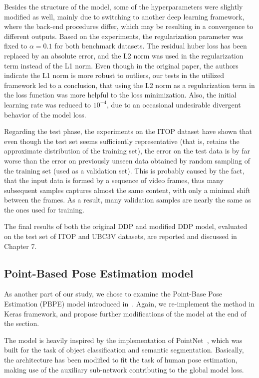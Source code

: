 \noindent Besides the structure of the model, some of the hyperparameters were slightly modified as well, mainly due to switching to another deep learning framework, where the back-end procedures differ, which may be resulting in a convergence to different outputs. Based on the experiments, the regularization parameter was fixed to $\alpha = 0.1$ for both benchmark datasets. The residual huber loss has been replaced by an absolute error, and the L2 norm was used in the regularization term instead of the L1 norm. Even though in the original paper, the authors indicate the L1 norm is more robust to outliers, our tests in the utilized framework led to a conclusion, that using the L2 norm as a regularization term in the loss function was more helpful to the loss minimization. Also, the initial learning rate was reduced to $10^{-4}$, due to an occasional undesirable divergent behavior of the model loss.\par
\vspace{5mm}
\noindent Regarding the test phase, the experiments on the ITOP dataset have shown that even though the test set seems sufficiently representative (that is, retains the approximate distribution of the training set), the error on the test data is by far worse than the error on previously unseen data obtained by random sampling of the training set (used as a validation set). This is probably caused by the fact, that the input data is formed by a sequence of video frames, thus many subsequent samples captures almost the same content, with only a minimal shift between the frames. As a result, many validation samples are nearly the same as the ones used for training.\par
\vspace{5mm}
\noindent
The final results of both the original DDP and modified DDP model, evaluated on the test set of ITOP and UBC3V datasets, are reported and discussed in Chapter 7.


\subsection{Point-Based Pose Estimation model}

As another part of our study, we chose to examine the Point-Base Pose Estimation (PBPE) model introduced in~\cite{Ali19}. Again, we re-implement the method in Keras framework, and propose further modifications of the model at the end of the section.\par
\vspace{5mm}
\noindent %
The model is heavily inspired by the implementation of PointNet~\cite{DBLP:journals/corr/QiSMG16}, which was built for the task of object classification and semantic segmentation. Basically, the architecture has been modified to fit the task of human pose estimation, making use of the auxiliary sub-network contributing to the global model loss.


